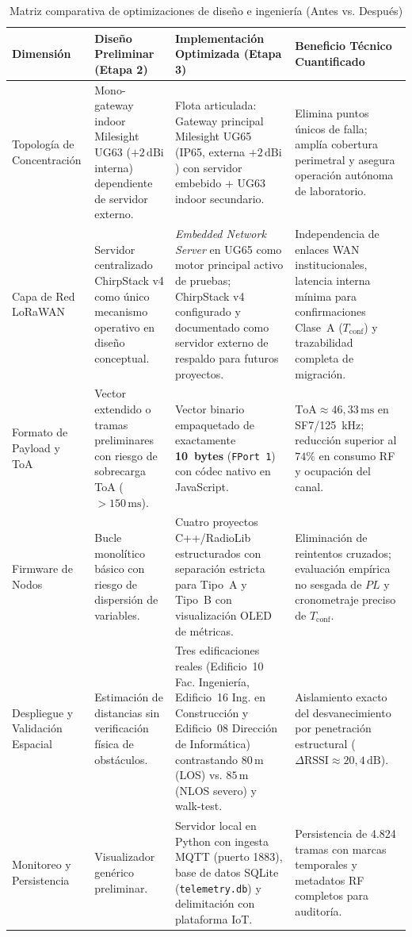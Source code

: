 \documentclass[12pt,oneside,openany,spanish,oldfontcommands]{memoir}
\renewcommand{\arraystretch}{1.15}
\begin{document}
\begin{table}[!htbp]
\centering
\caption{Matriz comparativa de optimizaciones de diseño e ingeniería (Antes vs. Después)}\label{tab:antes-despues}
\scriptsize
\setlength{\tabcolsep}{2.5pt}
\renewcommand{\arraystretch}{0.98}
\begin{tabularx}{\textwidth}{>{\raggedright\arraybackslash}p{2.3cm} >{\raggedright\arraybackslash}X >{\raggedright\arraybackslash}X >{\raggedright\arraybackslash}p{2.5cm}}
\toprule
\textbf{Dimensión} & \textbf{Diseño Preliminar (Etapa 2)} & \textbf{Implementación Optimizada (Etapa 3)} & \textbf{Beneficio Técnico Cuantificado} \\
\midrule
Topología de Concentración &
Mono-gateway indoor Milesight UG63 ($+2\,\text{dBi}$ interna) dependiente de servidor externo. &
Flota articulada: Gateway principal Milesight UG65 (IP65, externa $+2\,\text{dBi}$) con servidor embebido + UG63 indoor secundario. &
Elimina puntos únicos de falla; amplía cobertura perimetral y asegura operación autónoma de laboratorio. \\
\midrule
Capa de Red LoRaWAN &
Servidor centralizado ChirpStack v4 como único mecanismo operativo en diseño conceptual. &
\textit{Embedded Network Server} en UG65 como motor principal activo de pruebas; ChirpStack v4 configurado y documentado como servidor externo de respaldo para futuros proyectos. &
Independencia de enlaces WAN institucionales, latencia interna mínima para confirmaciones Clase~A ($T_{\mathrm{conf}}$) y trazabilidad completa de migración. \\
\midrule
Formato de Payload y ToA &
Vector extendido o tramas preliminares con riesgo de sobrecarga ToA ($>150\,\text{ms}$). &
Vector binario empaquetado de exactamente \textbf{10~bytes} (\texttt{FPort 1}) con códec nativo en JavaScript. &
$\text{ToA} \approx 46,33\,\text{ms}$ en SF7/125~kHz; reducción superior al $74\%$ en consumo RF y ocupación del canal. \\
\midrule
Firmware de Nodos &
Bucle monolítico básico con riesgo de dispersión de variables. &
Cuatro proyectos C++/RadioLib estructurados con separación estricta para Tipo~A y Tipo~B con visualización OLED de métricas. &
Eliminación de reintentos cruzados; evaluación empírica no sesgada de $PL$ y cronometraje preciso de $T_{\mathrm{conf}}$. \\
\midrule
Despliegue y Validación Espacial &
Estimación de distancias sin verificación física de obstáculos. &
Tres edificaciones reales (Edificio~10 Fac. Ingeniería, Edificio~16 Ing. en Construcción y Edificio~08 Dirección de Informática) contrastando $80\,\text{m}$ (LOS) vs. $85\,\text{m}$ (NLOS severo) y walk-test. &
Aislamiento exacto del desvanecimiento por penetración estructural ($\Delta \text{RSSI} \approx 20,4\,\text{dB}$). \\
\midrule
Monitoreo y Persistencia &
Visualizador genérico preliminar. &
Servidor local en Python con ingesta MQTT (puerto 1883), base de datos SQLite (\texttt{telemetry.db}) y delimitación con plataforma IoT. &
Persistencia de 4.824 tramas con marcas temporales y metadatos RF completos para auditoría. \\
\bottomrule
\end{tabularx}
\end{table}
\end{document}
